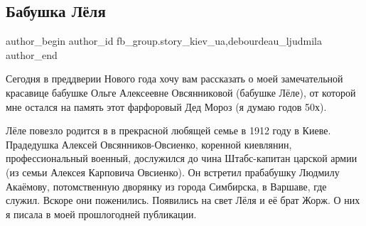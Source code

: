  
 
 
 
 
 
\subsection{Бабушка Лёля}
\label{sec:28_12_2021.fb.fb_group.story_kiev_ua.1.babushka_lelja}
 
\ifcmt
 author_begin
   author_id fb_group.story_kiev_ua,debourdeau_ljudmila
 author_end
\fi

Сегодня в преддверии Нового года хочу вам рассказать о моей замечательной
красавице бабушке Ольге Алексеевне Овсянниковой (бабушке Лёле), от которой мне
остался на память этот фарфоровый Дед Мороз (я думаю годов 50х). 

Лёле повезло родится в в прекрасной любящей семье в 1912 году в Киеве.
Прадедушка Алексей Овсянников-Овсиенко, коренной киевлянин, профессиональный
военный, дослужился до чина Штабс-капитан царской армии (из семьи Алексея
Карповича Овсиенко). Он встретил прабабушку Людмилу Акаёмову, потомственную
дворянку из города Симбирска, в Варшаве, где служил. Вскоре они поженились.
Появились на свет Лёля и её брат Жорж. О них я писала в моей прошлогодней
публикации. 

\raggedcolumns
\begin{multicols}{3} %
\setlength{\parindent}{0pt}






\end{multicols} %

